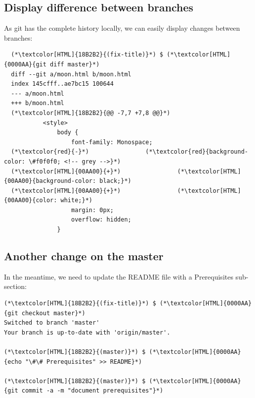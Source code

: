 \subsection{Display difference between branches}
\begin{frame}[fragile]
  \subslidetitle

  As git has the complete history locally, we can easily display changes between branches:

  \begin{lstlisting}
  (*\textcolor[HTML]{18B2B2}{(fix-title)}*) $ (*\textcolor[HTML]{0000AA}{git diff master}*)
  diff --git a/moon.html b/moon.html
  index 145cfff..ae7bc15 100644
  --- a/moon.html
  +++ b/moon.html
  (*\textcolor[HTML]{18B2B2}{@@ -7,7 +7,8 @@}*)
           <style>
               body {
                   font-family: Monospace;
  (*\textcolor{red}{-}*)                (*\textcolor{red}{background-color: \#f0f0f0; <!-- grey -->}*)
  (*\textcolor[HTML]{00AA00}{+}*)                (*\textcolor[HTML]{00AA00}{background-color: black;}*)
  (*\textcolor[HTML]{00AA00}{+}*)                (*\textcolor[HTML]{00AA00}{color: white;}*)
                   margin: 0px;
                   overflow: hidden;
               }
\end{lstlisting}
\end{frame}

\subsection{Another change on the master}
\begin{frame}[fragile]
  \subslidetitle

  In the meantime, we need to update the README file with a Prerequisites sub-section:
  \begin{lstlisting}
(*\textcolor[HTML]{18B2B2}{(fix-title)}*) $ (*\textcolor[HTML]{0000AA}{git checkout master}*)
Switched to branch 'master'
Your branch is up-to-date with 'origin/master'.

(*\textcolor[HTML]{18B2B2}{(master)}*) $ (*\textcolor[HTML]{0000AA}{echo "\#\# Prerequisites" >> README}*)

(*\textcolor[HTML]{18B2B2}{(master)}*) $ (*\textcolor[HTML]{0000AA}{git commit -a -m "document prerequisites"}*)
\end{lstlisting}

\end{frame}


